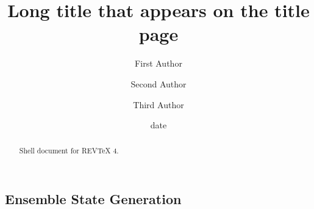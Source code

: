 \documentclass[aps,preprint]{revtex4}%
\begin{document}
\title[Short title for running header]{Long title that appears on the title page}
\author{First Author}
\author{Second Author}
\author{Third Author}

\begin{abstract}
Shell document for REV\TeX{} 4.

\end{abstract}
\date[Date text]{date}




\maketitle
\tableofcontents


\subsection{Ensemble State Generation}
\end{document}
